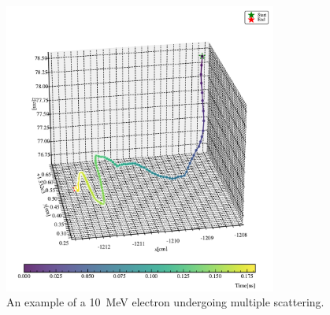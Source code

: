 \begin{figure}
	\begin{center}
		\includegraphics[width=0.8\textwidth]{reconstruction/emmisionProfile/multiscatter.pdf}
	\end{center}
	\caption{An example of a \SI{10}{MeV} electron undergoing multiple scattering.}
	\label{fig:multipleScattering}
\end{figure}

